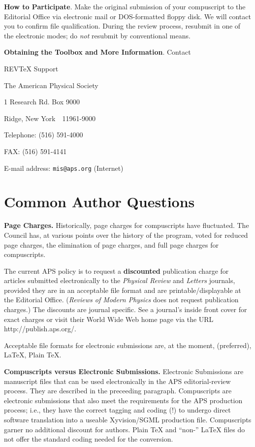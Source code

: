 \medskip
{\bf How to Participate}.  Make the original submission of your \REVTeX{}
compuscript to the Editorial Office via electronic mail or DOS-formatted
floppy disk. We will contact you to confirm file qualification. During the
review process, resubmit in one of the electronic modes; do {\em not\/}
resubmit by conventional means.

\medskip
{\bf Obtaining the Toolbox and More Information}. Contact

\medskip
REV\TeX\/ Support

The American Physical Society

1 Research Rd. Box 9000

Ridge, New York~~11961-9000

\medskip
Telephone: (516) 591-4000

FAX: (516) 591-4141

E-mail address: {\tt mis@aps.org} (Internet)


\section{Common Author Questions}
\label{sec:macros}

{\bf Page Charges.}
Historically, page charges for compuscripts have fluctuated. The Council
has, at various points over the history of the program, voted for
reduced page charges, the elimination of page charges, and full page
charges for compuscripts.

The current APS policy is to request a {\bf discounted} publication
charge for articles submitted electronically to the {\em Physical
Review} and {\em Letters} journals, provided they are in an acceptable
file format and are printable/displayable at the Editorial Office.
({\em Reviews of Modern Physics} does not request publication
charges.) The discounts are journal specific. See a journal's inside
front cover for exact charges or visit their World Wide Web home page
via the URL http://publish.aps.org/. 

Acceptable file formats for electronic submissions are, at the moment,
\REVTeX\/ (preferred), \LaTeX\/, Plain \TeX. 

{\bf Compuscripts versus Electronic Submissions.}
Electronic  Submissions are manuscript files that can be used
electronically in the APS editorial-review process. They are described
in the preceeding paragraph. Compuscripts are electronic submissions
that also meet the requirements for the APS production process; i.e.,
they have the correct tagging and coding (\REVTeX!) to undergo direct
software translation into a useable Xyvision/SGML production file.
Compuscripts garner no additional discount for authors. Plain \TeX\/
and ``non-\REVTeX'' \LaTeX\/ files do not offer the standard coding
needed for the conversion. 

